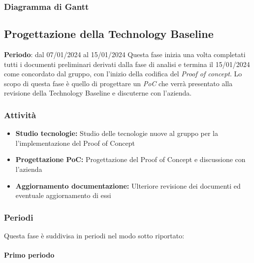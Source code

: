 \newpage 
\subsubsection{Diagramma di Gantt}\label{sec:pianificazione:analisi:gantt}


\subsection{Progettazione della Technology Baseline}\label{sec:pianificazione:progRTB}

\textbf{Periodo}: dal 07/01/2024 al 15/01/2024
Questa fase inizia una volta completati tutti i documenti preliminari derivati dalla fase di analisi e termina il 15/01/2024 come concordato dal gruppo, con l'inizio della codifica del \textit{Proof of concept}. Lo scopo di questa fase è quello di progettare un \textit{PoC} che verrà presentato alla revisione della Technology Baseline e discuterne con l'azienda.

\subsubsection{Attività}\label{sec:pianificazione:progRTB:attivita}
\begin{itemize}
    \item \textbf{Studio tecnologie:} Studio delle tecnologie nuove al gruppo per la l'implementazione del Proof of Concept
    \item \textbf{Progettazione PoC:} Progettazione del Proof of Concept e discussione con l'azienda
    \item \textbf{Aggiornamento documentazione:} Ulteriore revisione dei documenti ed eventuale aggiornamento di essi
\end{itemize}

\newpage

\subsubsection{Periodi}\label{sec:pianificazione:progRTB:periodi}
Questa fase è suddivisa in periodi nel modo sotto riportato:

\paragraph{Primo periodo}\label{sec:pianificazione:progRTB:periodi:primo}

